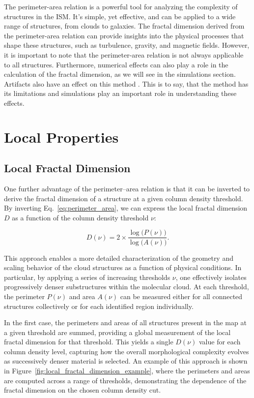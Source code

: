 The perimeter-area relation is a powerful tool for analyzing the complexity of structures in the ISM. It's simple, yet effective, and can be applied to a wide range of structures, from clouds to galaxies. The fractal dimension derived from the perimeter-area relation can provide insights into the physical processes that shape these structures, such as turbulence, gravity, and magnetic fields.
However, it is important to note that the perimeter-area relation is not always applicable to all structures. Furthermore, numerical effects can also play a role in the calculation of the fractal dimension, as we will see in the simulations section. Artifacts also have an effect on this method \cite{imre2006artificial}. This is to say, that the method has its limitations and simulations play an important role in understanding these effects. 

\section{Local Properties}

\subsection{Local Fractal Dimension}

One further advantage of the perimeter–area relation is that it can be inverted to derive the fractal dimension of a structure at a given column density threshold. By inverting Eq.~\ref{eq:perimeter_area}, we can express the local fractal dimension $D$ as a function of the column density threshold $\nu$:

\begin{equation}
    \label{eq:local_fractal_dimension}
    D(\nu) = 2 \times \frac{\log\bigl(P(\nu)\bigr)}{\log\bigl(A(\nu)\bigr)}.
\end{equation}

This approach enables a more detailed characterization of the geometry and scaling behavior of the cloud structures as a function of physical conditions. In particular, by applying a series of increasing thresholds $\nu$, one effectively isolates progressively denser substructures within the molecular cloud. At each threshold, the perimeter $P(\nu)$ and area $A(\nu)$ can be measured either for all connected structures collectively or for each identified region individually.

In the first case, the perimeters and areas of all structures present in the map at a given threshold are summed, providing a global measurement of the local fractal dimension for that threshold. This yields a single $D(\nu)$ value for each column density level, capturing how the overall morphological complexity evolves as successively denser material is selected. An example of this approach is shown in Figure~\ref{fig:local_fractal_dimension_example}, where the perimeters and areas are computed across a range of thresholds, demonstrating the dependence of the fractal dimension on the chosen column density cut.

